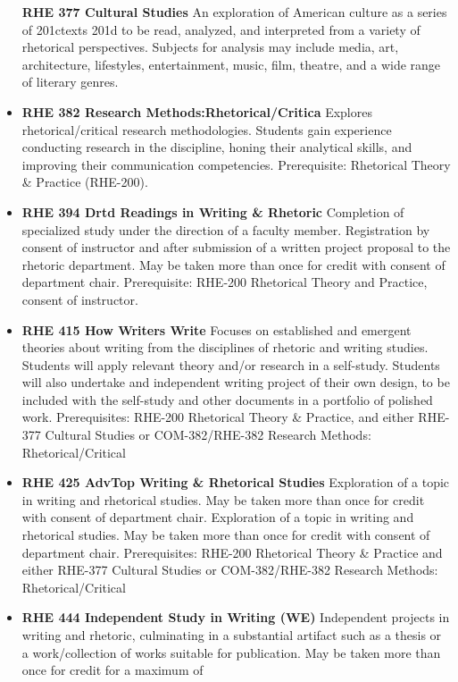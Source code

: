 \documentclass[
  letterpaper,
]{scrbook}
\begin{document}
\begin{itemize}
  \textbf{RHE 377 Cultural Studies} An exploration of American culture
  as a series of 201ctexts 201d to be read, analyzed, and interpreted
  from a variety of rhetorical perspectives. Subjects for analysis may
  include media, art, architecture, lifestyles, entertainment, music,
  film, theatre, and a wide range of literary genres.\\
\item
  \textbf{RHE 382 Research Methods:Rhetorical/Critica} Explores
  rhetorical/critical research methodologies. Students gain experience
  conducting research in the discipline, honing their analytical skills,
  and improving their communication competencies. Prerequisite:
  Rhetorical Theory \& Practice (RHE-200).
\item
  \textbf{RHE 394 Drtd Readings in Writing \& Rhetoric} Completion of
  specialized study under the direction of a faculty member.
  Registration by consent of instructor and after submission of a
  written project proposal to the rhetoric department. May be taken more
  than once for credit with consent of department chair. Prerequisite:
  RHE-200 Rhetorical Theory and Practice, consent of instructor.
\item
  \textbf{RHE 415 How Writers Write} Focuses on established and emergent
  theories about writing from the disciplines of rhetoric and writing
  studies. Students will apply relevant theory and/or research in a
  self-study. Students will also undertake and independent writing
  project of their own design, to be included with the self-study and
  other documents in a portfolio of polished work. Prerequisites:
  RHE-200 Rhetorical Theory \& Practice, and either RHE-377 Cultural
  Studies or COM-382/RHE-382 Research Methods: Rhetorical/Critical\\
\item
  \textbf{RHE 425 AdvTop Writing \& Rhetorical Studies} Exploration of a
  topic in writing and rhetorical studies. May be taken more than once
  for credit with consent of department chair. Exploration of a topic in
  writing and rhetorical studies. May be taken more than once for credit
  with consent of department chair. Prerequisites: RHE-200 Rhetorical
  Theory \& Practice and either RHE-377 Cultural Studies or
  COM-382/RHE-382 Research Methods: Rhetorical/Critical
\item
  \textbf{RHE 444 Independent Study in Writing (WE)} Independent
  projects in writing and rhetoric, culminating in a substantial
  artifact such as a thesis or a work/collection of works suitable for
  publication. May be taken more than once for credit for a maximum of

\end{itemize}
\end{document}
